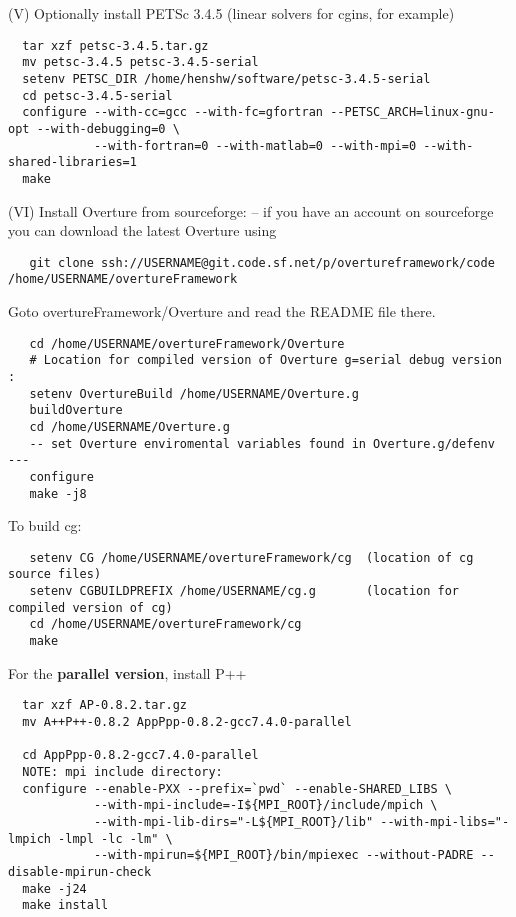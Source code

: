 \bigskip\noindent
(V) Optionally install PETSc 3.4.5 (linear solvers for cgins, for example)
\begin{verbatim}
  tar xzf petsc-3.4.5.tar.gz
  mv petsc-3.4.5 petsc-3.4.5-serial
  setenv PETSC_DIR /home/henshw/software/petsc-3.4.5-serial
  cd petsc-3.4.5-serial
  configure --with-cc=gcc --with-fc=gfortran --PETSC_ARCH=linux-gnu-opt --with-debugging=0 \
            --with-fortran=0 --with-matlab=0 --with-mpi=0 --with-shared-libraries=1
  make 
\end{verbatim}


\bigskip\noindent
(VI) Install Overture from sourceforge: -- if you have an account on sourceforge you can download the
latest Overture using 
\begin{verbatim}
   git clone ssh://USERNAME@git.code.sf.net/p/overtureframework/code /home/USERNAME/overtureFramework
\end{verbatim}

Goto overtureFramework/Overture and read the README file there.
\begin{verbatim}
   cd /home/USERNAME/overtureFramework/Overture
   # Location for compiled version of Overture g=serial debug version : 
   setenv OvertureBuild /home/USERNAME/Overture.g   
   buildOverture
   cd /home/USERNAME/Overture.g 
   -- set Overture enviromental variables found in Overture.g/defenv  ---
   configure
   make -j8    
\end{verbatim}

To build cg:
\begin{verbatim}
   setenv CG /home/USERNAME/overtureFramework/cg  (location of cg source files)
   setenv CGBUILDPREFIX /home/USERNAME/cg.g       (location for compiled version of cg)
   cd /home/USERNAME/overtureFramework/cg
   make   
\end{verbatim}

\bigskip 
\bigskip 
\bigskip\noindent
For the \textbf{parallel version}, install P++ 
\begin{verbatim}
  tar xzf AP-0.8.2.tar.gz
  mv A++P++-0.8.2 AppPpp-0.8.2-gcc7.4.0-parallel
  
  cd AppPpp-0.8.2-gcc7.4.0-parallel
  NOTE: mpi include directory: 
  configure --enable-PXX --prefix=`pwd` --enable-SHARED_LIBS \
            --with-mpi-include=-I${MPI_ROOT}/include/mpich \  
            --with-mpi-lib-dirs="-L${MPI_ROOT}/lib" --with-mpi-libs="-lmpich -lmpl -lc -lm" \
            --with-mpirun=${MPI_ROOT}/bin/mpiexec --without-PADRE --disable-mpirun-check 
  make -j24
  make install
\end{verbatim}

